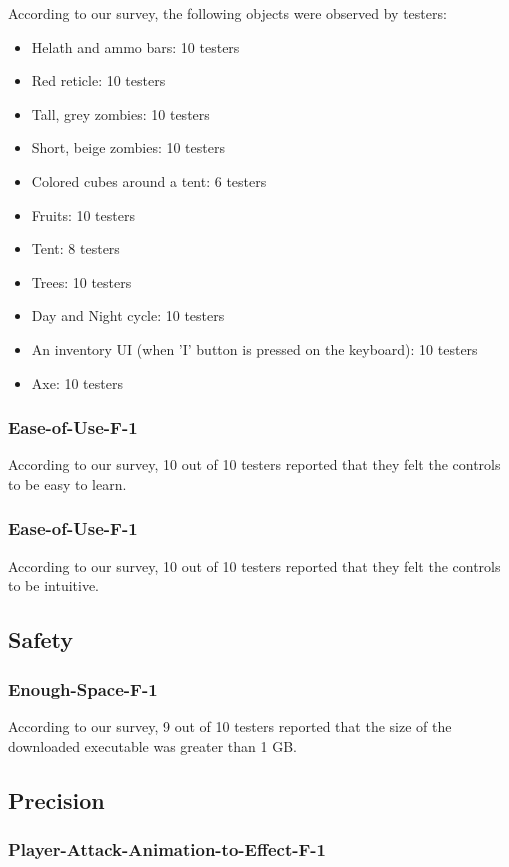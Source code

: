 \documentclass[12pt, titlepage]{article}
\begin{document}
	According to our survey, the following objects were observed by testers:
	\begin{itemize}
		\item Helath and ammo bars: 10 testers
		\item Red reticle: 10 testers
		\item Tall, grey zombies: 10 testers
		\item Short, beige zombies: 10 testers
		\item Colored cubes around a tent: 6 testers
		\item Fruits: 10 testers
		\item Tent: 8 testers
		\item Trees: 10 testers
		\item Day and Night cycle: 10 testers
		\item An inventory UI (when 'I' button is pressed on the keyboard): 10 testers
		\item Axe: 10 testers 
	\end{itemize}
	\subsubsection{Ease-of-Use-F-1}
	
	According to our survey, 10 out of 10 testers reported that they felt the controls to be easy to learn.
	\subsubsection{Ease-of-Use-F-1}
	
	According to our survey, 10 out of 10 testers reported that they felt the controls to be intuitive.
\subsection{Safety}
	\subsubsection{Enough-Space-F-1}
	
	According to our survey, 9 out of 10 testers reported that the size of the downloaded executable was greater than 1 GB.
\subsection{Precision}
	\subsubsection{Player-Attack-Animation-to-Effect-F-1}
	
\end{document}
